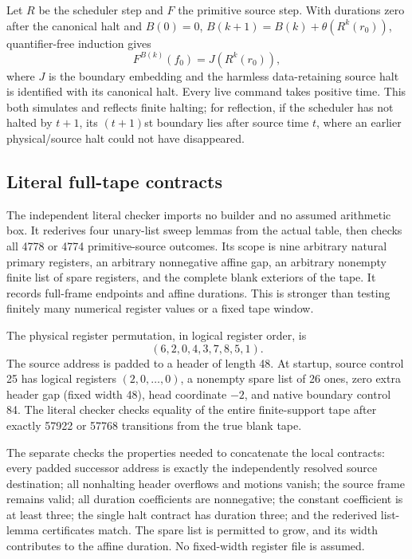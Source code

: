 Let $R$ be the scheduler step and $F$ the primitive source step.
With durations zero after the canonical halt and
$B(0)=0$, $B(k+1)=B(k)+\theta(R^k(r_0))$, quantifier-free
induction gives
\[
 F^{B(k)}(f_0)=J(R^k(r_0)),
\]
where $J$ is the boundary embedding and the harmless data-retaining
source halt is identified with its canonical halt. Every live
command takes positive time. This both simulates and reflects
finite halting; for reflection, if the scheduler has not halted by
$t+1$, its $(t+1)$st boundary lies after source time $t$, where an
earlier physical/source halt could not have disappeared.

\subsection{Literal full-tape contracts}

The independent literal checker imports no builder and no assumed
arithmetic box. It rederives four unary-list sweep lemmas from the
actual table, then checks all 4778 or 4774 primitive-source outcomes.
Its scope is nine arbitrary natural primary registers, an arbitrary
nonnegative affine gap, an arbitrary nonempty finite list of spare
registers, and the complete blank exteriors of the tape. It records
full-frame endpoints and affine durations. This is stronger than
testing finitely many numerical register values or a fixed tape
window.

The physical register permutation, in logical register order, is
\[
 (6,2,0,4,3,7,8,5,1).
\]
The source address is padded to a header of length 48. At startup,
source control 25 has logical registers $(2,0,\ldots,0)$, a
nonempty spare list of 26 ones, zero extra header gap (fixed width 48),
head coordinate $-2$, and
native boundary control 84. The literal checker checks equality of
the entire finite-support tape after exactly 57922 or 57768
transitions from the true blank tape.

The separate  checks the properties
needed to concatenate the local contracts: every padded successor
address is exactly the independently resolved source destination;
all nonhalting header overflows and motions vanish; the source
frame remains valid; all duration coefficients are nonnegative;
the constant coefficient is at least three; the single halt
contract has duration three; and the rederived list-lemma
certificates match. The spare list is permitted to grow, and its
width contributes to the affine duration. No fixed-width register
file is assumed.

